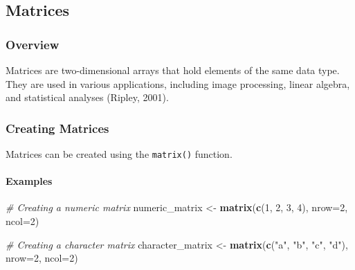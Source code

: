 \documentclass[
  b5paper]{book}
\newenvironment{Shaded}{\begin{snugshade}}{\end{snugshade}}
\newcommand{\AttributeTok}[1]{\textcolor[rgb]{0.13,0.29,0.53}{#1}}
\newcommand{\CommentTok}[1]{\textcolor[rgb]{0.56,0.35,0.01}{\textit{#1}}}
\newcommand{\DecValTok}[1]{\textcolor[rgb]{0.00,0.00,0.81}{#1}}
\newcommand{\FunctionTok}[1]{\textcolor[rgb]{0.13,0.29,0.53}{\textbf{#1}}}
\newcommand{\NormalTok}[1]{#1}
\newcommand{\OtherTok}[1]{\textcolor[rgb]{0.56,0.35,0.01}{#1}}
\newcommand{\StringTok}[1]{\textcolor[rgb]{0.31,0.60,0.02}{#1}}
\begin{document}
\hypertarget{matrices}{%
\subsection*{Matrices}\label{matrices}}

\hypertarget{overview-3}{%
\subsubsection*{Overview}\label{overview-3}}

Matrices are two-dimensional arrays that hold elements of the same data type. They are used in various applications, including image processing, linear algebra, and statistical analyses (Ripley, 2001).

\hypertarget{creating-matrices}{%
\subsubsection*{Creating Matrices}\label{creating-matrices}}

Matrices can be created using the \texttt{matrix()} function.

\hypertarget{examples-3}{%
\paragraph*{Examples}\label{examples-3}}

\begin{Shaded}
\begin{Highlighting}[]
\CommentTok{\# Creating a numeric matrix}
\NormalTok{numeric\_matrix }\OtherTok{\textless{}{-}} \FunctionTok{matrix}\NormalTok{(}\FunctionTok{c}\NormalTok{(}\DecValTok{1}\NormalTok{, }\DecValTok{2}\NormalTok{, }\DecValTok{3}\NormalTok{, }\DecValTok{4}\NormalTok{), }\AttributeTok{nrow=}\DecValTok{2}\NormalTok{, }\AttributeTok{ncol=}\DecValTok{2}\NormalTok{)}

\CommentTok{\# Creating a character matrix}
\NormalTok{character\_matrix }\OtherTok{\textless{}{-}} \FunctionTok{matrix}\NormalTok{(}\FunctionTok{c}\NormalTok{(}\StringTok{"a"}\NormalTok{, }\StringTok{"b"}\NormalTok{, }\StringTok{"c"}\NormalTok{, }\StringTok{"d"}\NormalTok{), }\AttributeTok{nrow=}\DecValTok{2}\NormalTok{, }\AttributeTok{ncol=}\DecValTok{2}\NormalTok{)}
\end{Highlighting}
\end{Shaded}
\end{document}
